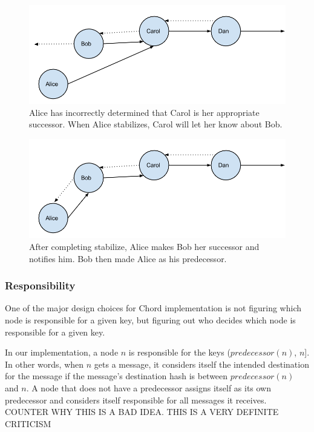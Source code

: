 \documentclass[conference, compsocconf, letterpaper]{IEEEtran}
\begin{document}
\begin{figure}
    \includegraphics[width=\linewidth]{abcd1}
    \caption{Alice has incorrectly determined that Carol is her appropriate successor.  When Alice stabilizes, Carol will let her know about Bob.}
    \label{abcd1}
\end{figure}


\begin{figure}
    \includegraphics[width=\linewidth]{abcd2}
    \caption{After completing stabilize, Alice makes Bob her successor and notifies him. Bob then made Alice as his predecessor.}
    \label{abcd2}
\end{figure}



\subsubsection{Responsibility}
One of the major design choices for Chord implementation is not figuring which node is responsible for a given key, but figuring out who decides which node is responsible for a given key.

In our implementation, a node $n$ is responsible for the keys ($predecessor(n)$, $n$].  In other words, when $n$ gets a message, it considers itself the intended destination for the message if the message's destination hash is between $predecessor(n)$ and $n$.  A node that does not have a predecessor assigns itself as its own predecessor and considers itself responsible for all messages it receives.  COUNTER WHY THIS IS A BAD IDEA.  THIS IS A VERY DEFINITE CRITICISM 
\end{document}
